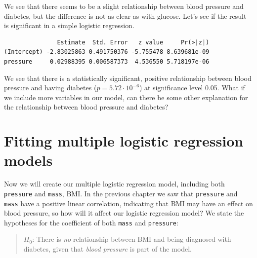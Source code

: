 \documentclass[
  letterpaper,
  DIV=11,
  numbers=noendperiod]{scrreprt}
\newenvironment{Shaded}{\begin{snugshade}}{\end{snugshade}}
\newcommand{\AttributeTok}[1]{\textcolor[rgb]{0.40,0.45,0.13}{#1}}
\newcommand{\FunctionTok}[1]{\textcolor[rgb]{0.28,0.35,0.67}{#1}}
\newcommand{\NormalTok}[1]{\textcolor[rgb]{0.00,0.23,0.31}{#1}}
\newcommand{\OtherTok}[1]{\textcolor[rgb]{0.00,0.23,0.31}{#1}}
\newcommand{\SpecialCharTok}[1]{\textcolor[rgb]{0.37,0.37,0.37}{#1}}
\newcommand{\StringTok}[1]{\textcolor[rgb]{0.13,0.47,0.30}{#1}}
\begin{document}
We see that there seems to be a slight relationship between blood
pressure and diabetes, but the difference is not as clear as with
glucose. Let's see if the result is significant in a simple logistic
regression.

\begin{Shaded}
\end{Shaded}

\begin{verbatim}
               Estimate  Std. Error   z value     Pr(>|z|)
(Intercept) -2.83025863 0.491750376 -5.755478 8.639681e-09
pressure     0.02988395 0.006587373  4.536550 5.718197e-06
\end{verbatim}

We see that there is a statistically significant, positive relationship
between blood pressure and having diabetes (\(p = 5.72 \cdot 10^{-6}\))
at significance level 0.05. What if we include more variables in our
model, can there be some other explanation for the relationship between
blood pressure and diabetes?

\section{Fitting multiple logistic regression
models}\label{fitting-multiple-logistic-regression-models}

Now we will create our multiple logistic regression model, including
both \texttt{pressure} and \texttt{mass}, BMI. In the previous chapter
we saw that \texttt{pressure} and \texttt{mass} have a positive linear
correlation, indicating that BMI may have an effect on blood pressure,
so how will it affect our logistic regression model? We state the
hypotheses for the coefficient of both \texttt{mass} and
\texttt{pressure}:

\begin{quote}
\textbf{\(H_0\)}: There is \emph{no} relationship between BMI and being
diagnosed with diabetes, given that \emph{blood pressure} is part of the
model.
\end{quote}
\end{document}
